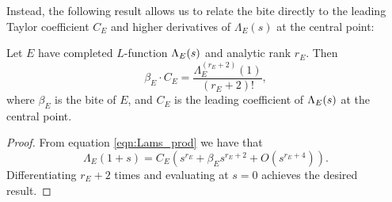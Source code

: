 Instead, the following result allows us to relate the bite directly to the leading Taylor coefficient $C_E$ and higher derivatives of $\Lambda_E(s)$ at the central point:
\begin{proposition}[GRH]\label{prop:bite_times_leading_coeff}
Let $E$ have completed $L$-function $\Lambda_E(s)$ and analytic rank $r_E$. Then
\begin{equation}
\beta_E\cdot C_E = \frac{\Lambda_E^{(r_E+2)}(1)}{(r_E+2)!},
\end{equation}
where $\beta_E$ is the bite of $E$, and $C_E$ is the leading coefficient of $\Lambda_E(s)$ at the central point.
\end{proposition}
\begin{proof}
From equation \ref{eqn:Lams_prod} we have that 
\begin{equation}
\Lambda_E(1+s) = C_E\left(s^{r_E} + \beta_E s^{r_E+2} + O(s^{r_E+4})\right).
\end{equation}
Differentiating $r_E+2$ times and evaluating at $s=0$ achieves the desired result.
\end{proof}


